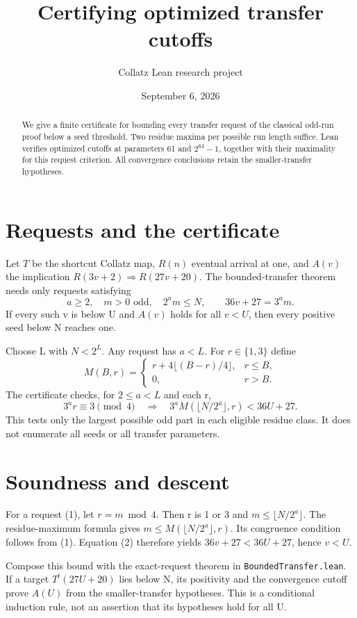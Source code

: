 \documentclass[10pt]{article}
\title{\vspace{-0.8cm}Certifying optimized transfer cutoffs}
\author{Collatz Lean research project}
\date{September 6, 2026}
\begin{document}
\maketitle\vspace{-0.4cm}
\begin{abstract}
We give a finite certificate for bounding every transfer request of the classical odd-run proof below a seed threshold. Two residue maxima per possible run length suffice. Lean verifies optimized cutoffs at parameters 61 and $2^{64}-1$, together with their maximality for this request criterion. All convergence conclusions retain the smaller-transfer hypotheses.
\end{abstract}
\section{Requests and the certificate}
Let $T$ be the shortcut Collatz map, $R(n)$ eventual arrival at one, and
$A(v)$ the implication $R(3v+2)\Rightarrow R(27v+20)$.
The bounded-transfer theorem needs only requests satisfying
\[
 a\ge2,\quad m>0\text{ odd},\quad 2^a m\le N,
 \qquad 36v+27=3^a m.                         \tag{1}
\]
If every such v is below U and $A(v)$ holds for all $v<U$, then every positive seed below N reaches one.

Choose L with $N<2^L$. Any request has $a<L$. For $r\in\{1,3\}$ define
\[
 M(B,r)=\begin{cases}r+4\lfloor(B-r)/4\rfloor,&r\le B,\\0,&r>B.\end{cases}
\]
The certificate checks, for $2\le a<L$ and each r,
\[
 3^a r\equiv3\pmod4\quad\Longrightarrow\quad
 3^a M(\lfloor N/2^a\rfloor,r)<36U+27.        \tag{2}
\]
This tests only the largest possible odd part in each eligible residue class. It does not enumerate all seeds or all transfer parameters.
\section{Soundness and descent}
For a request (1), let $r=m\bmod4$. Then r is 1 or 3 and $m\le\lfloor N/2^a\rfloor$. The residue-maximum formula gives $m\le M(\lfloor N/2^a\rfloor,r)$. Its congruence condition follows from (1). Equation (2) therefore yields $36v+27<36U+27$, hence $v<U$.

Compose this bound with the exact-request theorem in \texttt{BoundedTransfer.lean}. If a target $T^t(27U+20)$ lies below N, its positivity and the convergence cutoff prove $A(U)$ from the smaller-transfer hypotheses. This is a conditional induction rule, not an assertion that its hypotheses hold for all U.
\end{document}
